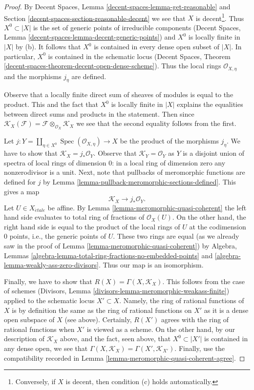 \documentclass{stacks-project}
\theoremstyle{plain}
\theoremstyle{definition}
\theoremstyle{remark}
\numberwithin{equation}{subsection}
\def\Spec{\mathop{\mathrm{Spec}}}
\def\etale{{\acute{e}tale}}
\begin{document}
\begin{proof}
By Decent Spaces, Lemma \ref{decent-spaces-lemma-get-reasonable} and
Section \ref{decent-spaces-section-reasonable-decent}
we see that $X$ is decent\footnote{Conversely, if $X$ is decent,
then condition (c) holds automatically.}.
Thus $X^0 \subset |X|$ is the set of generic points of irreducible
components
(Decent Spaces, Lemma \ref{decent-spaces-lemma-decent-generic-points})
and $X^0$ is locally finite in $|X|$ by (b).
It follows that $X^0$ is contained in every dense open subset of $|X|$.
In particular, $X^0$ is contained in the schematic locus
(Decent Spaces, Theorem \ref{decent-spaces-theorem-decent-open-dense-scheme}).
Thus the local rings $\mathcal{O}_{X, \eta}$ and the morphisms $j_\eta$
are defined.

\medskip\noindent
Observe that a locally finite direct sum of sheaves of modules
is equal to the product. This and the fact that $X^0$ is locally
finite in $|X|$ explains the equalities between
direct sums and products in the statement.
Then since $\mathcal{K}_X(\mathcal{F}) =
\mathcal{F} \otimes_{\mathcal{O}_X} \mathcal{K}_X$
we see that the second equality follows from the first.

\medskip\noindent
Let
$j : Y = \coprod\nolimits_{\eta \in X^0} \Spec(\mathcal{O}_{X, \eta}) \to X$
be the product of the morphisms $j_\eta$.
We have to show that $\mathcal{K}_X = j_*\mathcal{O}_Y$.
Observe that $\mathcal{K}_Y = \mathcal{O}_Y$ as $Y$ is a disjoint
union of spectra of local rings of dimension $0$: in a local
ring of dimension zero any nonzerodivisor is a unit.
Next, note that pullbacks of meromorphic
functions are defined for $j$ by
Lemma \ref{lemma-pullback-meromorphic-sections-defined}.
This gives a map
$$
\mathcal{K}_X \longrightarrow j_*\mathcal{O}_Y.
$$
Let $U \in X_\etale$ be affine. By Lemma \ref{lemma-meromorphic-quasi-coherent}
the left hand side evaluates to total ring of fractions of $\mathcal{O}_X(U)$.
On the other hand, the right hand side is equal to the product of the
local rings of $U$ at the codimension $0$ points, i.e., the generic points
of $U$. These two rings are equal (as we already saw in the proof
of Lemma \ref{lemma-meromorphic-quasi-coherent}) by
Algebra, Lemmas
\ref{algebra-lemma-total-ring-fractions-no-embedded-points} and
\ref{algebra-lemma-weakly-ass-zero-divisors}.
Thus our map is an isomorphism.

\medskip\noindent
Finally, we have to show that $R(X) = \Gamma(X, \mathcal{K}_X)$.
This follows from the case of schemes
(Divisors, Lemma \ref{divisors-lemma-meromorphic-weakass-finite})
applied to the schematic locus $X' \subset X$.
Namely, the ring of rational functions of $X$ is by definition
the same as the ring of rational functions on $X'$
as it is a dense open subspace of $X$ (see above).
Certainly, $R(X')$ agrees with the ring of rational functions
when $X'$ is viewed as a scheme.
On the other hand, by our description of $\mathcal{K}_X$ above,
and the fact, seen above, that $X^0 \subset |X'|$
is contained in any dense open, we see that
$\Gamma(X, \mathcal{K}_X) = \Gamma(X', \mathcal{K}_{X'})$.
Finally, use the compatibility recorded in
Lemma \ref{lemma-meromorphic-quasi-coherent-agree}.
\end{proof}
\end{document}
